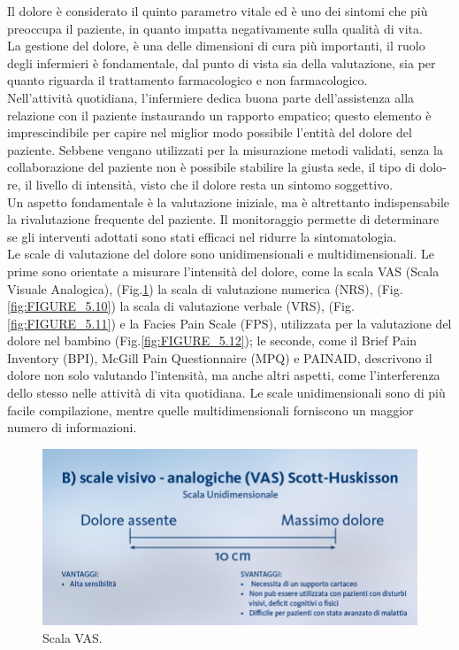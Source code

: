 Il dolore è considerato il quinto parametro vitale ed è uno dei sintomi che più preoccupa il paziente, 
in quanto impatta negativamente sulla qualità di vita.\\ La gestione del dolore, 
è una delle dimensioni di cura più importanti, il ruolo degli infermieri è fondamentale, 
dal punto di vista sia della valutazione, sia per quanto riguarda il trattamento farmacologico e non farmacologico.\\
Nell'attività quotidiana, l'infermiere dedica buona parte dell'assistenza alla relazione con il paziente instaurando
un rapporto empatico; questo elemento è imprescindibile per capire nel miglior modo possibile l'entità del
dolore del paziente. Sebbe­ne vengano utilizzati per la misurazione metodi validati, senza la collabo­razione del 
paziente non è possibile stabilire la giusta sede, il tipo di dolo­re, il livello di intensità, 
visto che il dolore resta un sintomo soggettivo\cite{BOOK3}.\\
Un aspetto fondamentale è la valutazione iniziale, ma è altret­tanto indispensabile la rivalutazione frequente del paziente.
Il monitorag­gio permette di determinare se gli interventi adottati sono stati effi­caci nel ridurre la 
sintomatologia\cite{BOOK3}.\\ 
Le scale di valutazione del dolore sono unidimensionali e multidimensionali.
Le prime sono orientate a misurare l'intensità del dolore, come 
la scala VAS (Scala Visuale Analogica), (Fig.\ref{fig:FIGURE_5.9}) 
la scala di valutazione numerica (NRS), (Fig.\ref{fig:FIGURE_5.10})
la scala di valutazione verbale (VRS), (Fig.\ref{fig:FIGURE_5.11}) e la Facies Pain Scale (FPS), utilizzata
per la valutazione del dolore nel bambino (Fig.\ref{fig:FIGURE_5.12});
le seconde, come il Brief Pain Inventory (BPI), McGill Pain Questionnaire (MPQ) 
e PAINAID, descrivono il dolore non solo valutando l'intensità, ma anche altri aspetti, 
come l'interferenza dello stesso nelle attività di vita quotidiana. Le scale unidimensionali sono di più 
facile compilazione, mentre quelle multidimensionali forniscono un maggior numero di informazioni\cite{BOOK3}.\\ 

\begin{figure}[H]
    \begin{center}
    \includegraphics[width=0.6\columnwidth]{img/VAS.jpeg}
    \vspace{-3mm}
    \end{center}
    \caption{Scala VAS.
    \cite{SCALEDOLORE}}
    \label{fig:FIGURE_5.9}
\end{figure}

